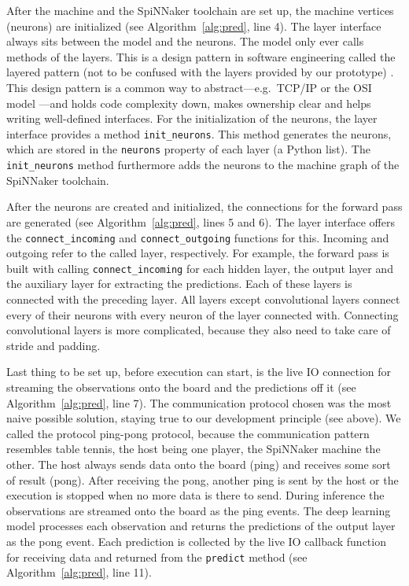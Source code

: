 \documentclass[]{article}
\begin{document}
After the machine and the SpiNNaker toolchain are set up, the
machine vertices (neurons) are initialized
(see Algorithm~\ref{alg:pred}, line 4).
The layer interface always sits between the model and the neurons.
The model only ever calls methods of the layers.
This is a design pattern in software engineering called the layered
pattern (not to be confused with the layers provided by our
prototype) \citep{morlion_2018}.
This design pattern is a common way to abstract---e.g.\ TCP/IP or the
OSI model \citep{tanenbaum_et_al_2013}---and holds code complexity
down, makes ownership clear and helps writing well-defined interfaces.
For the initialization of the neurons, the layer interface provides
a method \texttt{init\_neurons}.
This method generates the neurons, which are stored in the
\texttt{neurons} property of each layer (a Python list).
The \texttt{init\_neurons} method furthermore adds the neurons to
the machine graph of the SpiNNaker toolchain.

After the neurons are created and initialized, the connections for
the forward pass are generated (see Algorithm~\ref{alg:pred}, lines 5
and 6).
The layer interface offers the \texttt{connect\_incoming} and
\texttt{connect\_outgoing} functions for this.
Incoming and outgoing refer to the called layer, respectively.
For example, the forward pass is built with calling
\texttt{connect\_incoming} for each hidden layer, the output layer
and the auxiliary layer for extracting the predictions.
Each of these layers is connected with the preceding layer.
All layers except convolutional layers connect every of their neurons
with every neuron of the layer connected with.
Connecting convolutional layers is more complicated, because they
also need to take care of stride and padding.

Last thing to be set up, before execution can start, is the live IO
connection for streaming the observations onto the board and the
predictions off it (see Algorithm~\ref{alg:pred}, line 7).
The communication protocol chosen was the most naive possible
solution, staying true to our development principle (see above).
We called the protocol ping-pong protocol, because the communication
pattern resembles table tennis, the host being one player, the
SpiNNaker machine the other.
The host always sends data onto the board (ping) and receives some
sort of result (pong).
After receiving the pong, another ping is sent by the host or the
execution is stopped when no more data is there to send.
During inference the observations are streamed onto the board as the
ping events.
The deep learning model processes each observation and returns the
predictions of the output layer as the pong event.
Each prediction is collected by the live IO callback function for
receiving data and returned from the \texttt{predict} method
(see Algorithm~\ref{alg:pred}, line 11).
\end{document}

